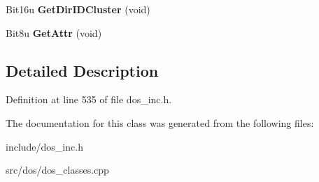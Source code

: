 \begin{DoxyCompactItemize}
\item 
\hypertarget{classDOS__DTA_a1a098a058e4f8237ecc38ed147033f9b}{Bit16u {\bfseries Get\-Dir\-I\-D\-Cluster} (void)}\label{classDOS__DTA_a1a098a058e4f8237ecc38ed147033f9b}

\item 
\hypertarget{classDOS__DTA_a2a46e3772a422180a20895e706613ff5}{Bit8u {\bfseries Get\-Attr} (void)}\label{classDOS__DTA_a2a46e3772a422180a20895e706613ff5}

\end{DoxyCompactItemize}


\subsection{Detailed Description}


Definition at line 535 of file dos\-\_\-inc.\-h.



The documentation for this class was generated from the following files\-:\begin{DoxyCompactItemize}
\item 
include/dos\-\_\-inc.\-h\item 
src/dos/dos\-\_\-classes.\-cpp\end{DoxyCompactItemize}
